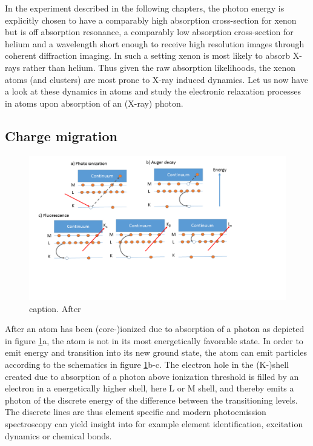 In the experiment described in the following chapters, the photon energy is explicitly chosen to have a comparably high absorption cross-section for xenon but is off absorption resonance, a comparably low absorption cross-section for helium and a wavelength short enough to receive high resolution images through coherent diffraction imaging. In such a setting xenon is most likely to absorb X-rays rather than helium. Thus given the raw absorption likelihoods, the xenon atoms (and clusters) are most prone to X-ray induced dynamics. Let us now have a look at these dynamics in atoms and study the electronic relaxation processes in atoms upon absorption of an (X-ray) photon.
%
%
%
%
%
\subsection{Charge migration}\label{sec:relaxation}
\begin{figure}
	\centering
		\includegraphics[width=1.00\textwidth]{images/el-relaxation.png}
	\caption{caption. After \citep[see][p.~19]{Als-Nielson-2011-JWS}}
	\label{fig:el-relaxation}
\end{figure}
After an atom has been (core-)ionized due to absorption of a photon as depicted in figure \ref{fig:el-relaxation}a, the atom is not in its most energetically favorable state. In order to emit energy and transition into its new ground state, the atom can emit particles according to the schematics in figure \ref{fig:el-relaxation}b-c. The electron hole in the (K-)shell created due to absorption of a photon above ionization threshold is filled by an electron in a energetically higher shell, here L or M shell, and thereby emits a photon of the discrete energy of the difference between the transitioning levels. The discrete lines are thus element specific and modern photoemission spectroscopy can yield insight into for example element identification, excitation dynamics or chemical bonds.
